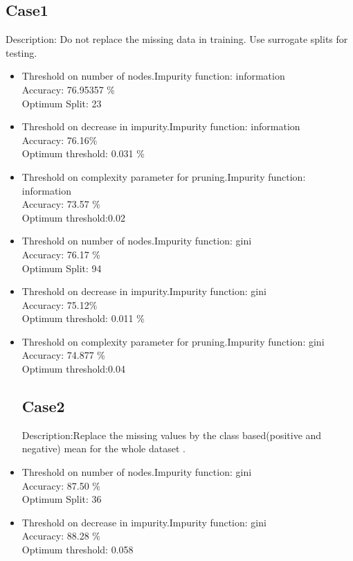 \documentclass[a4paper]{article}
\begin{document}
\subsection{Case1}
Description: Do not replace the missing data in training. Use surrogate splits for testing.
\begin{itemize} 
\item Threshold on number of nodes.Impurity function: information\\
Accuracy: 76.95357 \%  \\
Optimum Split: 23

\item Threshold on decrease in impurity.Impurity function: information\\
Accuracy: 76.16\%  \\
Optimum threshold: 0.031 \%

\item Threshold on complexity parameter for pruning.Impurity function: information\\
Accuracy: 73.57 \%  \\
Optimum threshold:0.02

\item Threshold on number of nodes.Impurity function: gini\\
Accuracy: 76.17 \%  \\
Optimum Split: 94

\item Threshold on decrease in impurity.Impurity function: gini\\
Accuracy: 75.12\%  \\
Optimum threshold: 0.011 \%

\item Threshold on complexity parameter for pruning.Impurity function: gini\\
Accuracy: 74.877 \%  \\
Optimum threshold:0.04

\subsection{Case2}
Description:Replace the missing values by the class based(positive and negative) mean for the whole dataset .

\item Threshold on number of nodes.Impurity function: gini\\
Accuracy: 87.50  \%  \\
Optimum Split: 36 

\item Threshold on decrease in impurity.Impurity function: gini\\
Accuracy: 88.28 \%  \\
Optimum threshold: 0.058


\end{itemize}
\end{document}

